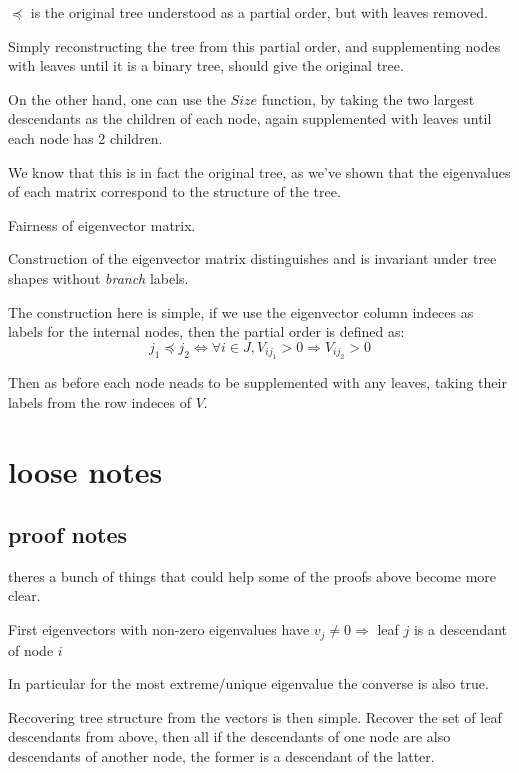 \documentclass{article}
\begin{document}
$\preccurlyeq$ is the original tree understood as a partial order, but with
leaves removed.

Simply reconstructing the tree from this partial order, and supplementing nodes
with leaves until it is a binary tree, should give the original tree.

On the other hand, one can use the $\mathit{Size}$ function, by taking the two
largest descendants as the children of each node, again supplemented with
leaves until each node has 2 children.

We know that this is in fact the original tree, as we've shown that the
eigenvalues of each matrix correspond to the structure of the tree.

\begin{theorem} Fairness of eigenvector matrix.

	Construction of the eigenvector matrix distinguishes and is invariant under tree shapes without \emph{branch} labels.
\end{theorem}

The construction here is simple, if we use the eigenvector column indeces as
labels for the internal nodes, then the partial order is defined as:
\[j_1 \preccurlyeq j_2 \Leftrightarrow \forall i \in J, V_{ij_1} > 0
\Rightarrow V_{ij_2} > 0 \]

Then as before each node neads to be supplemented with any leaves, taking their
labels from the row indeces of $V$.

\section{loose notes}

\subsection{proof notes}

theres a bunch of things that could help some of the proofs above become more
clear.

First eigenvectors with non-zero eigenvalues have $v_{j} \neq 0 \Rightarrow$
leaf $j$ is a descendant of node $i$

In particular for the most extreme/unique eigenvalue the converse is also true.

Recovering tree structure from the vectors is then simple.
Recover the set of leaf descendants from above, then all if the descendants of
one node are also descendants of another node, the former is a descendant of
the latter.
\end{document}

